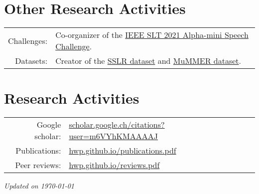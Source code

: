 \documentclass[a4paper,9pt]{extarticle} %
\begin{document}

\section{Other Research Activities}

\begin{tabular}{rl}
  Challenges: & Co-organizer of the \href{http://asc.ubtrobot.com/}{IEEE SLT 2021 Alpha-mini Speech Challenge}. \\
  Datasets:   & Creator of the \href{https://www.idiap.ch/dataset/sslr}{SSLR dataset} and \href{https://www.idiap.ch/dataset/mummer}{MuMMER dataset}. \\
\end{tabular}

\fi

\section{Research Activities}

\begin{tabular}{rl}
  Google scholar: & \href{https://scholar.google.ch/citations?user=m6VYhKMAAAAJ&hl=en}{scholar.google.ch/citations?user=m6VYhKMAAAAJ} \\
  Publications: & \href{http://hwp.github.io/publications.pdf}{hwp.github.io/publications.pdf} \\
  Peer reviews: & \href{http://hwp.github.io/reviews.pdf}{hwp.github.io/reviews.pdf} \\
\end{tabular}



\vfill
\centering \footnotesize \itshape{Updated on \today}
\end{document}
